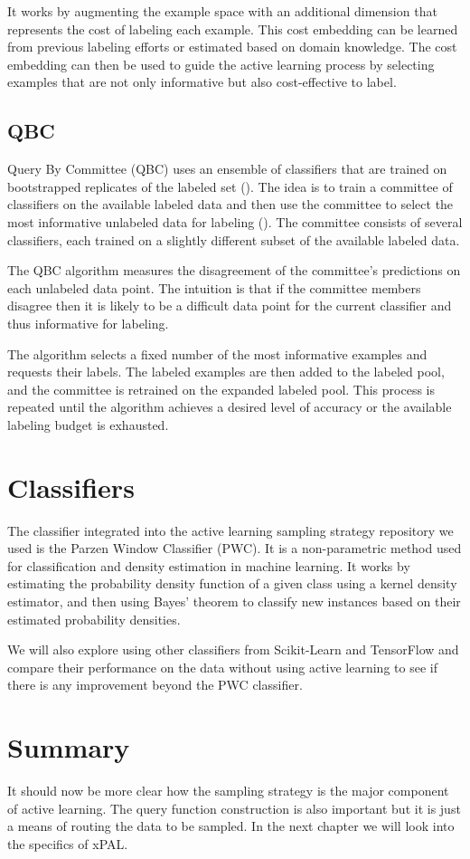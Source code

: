 It works by augmenting the example space with an additional dimension that represents the cost of labeling each example. This cost embedding can be learned from previous labeling efforts or estimated based on domain knowledge. The cost embedding can then be used to guide the active learning process by selecting examples that are not only informative but also cost-effective to label.

\subsection{QBC}
Query By Committee (QBC) uses an ensemble of classifiers that are trained on bootstrapped replicates of the labeled set (\cite{seung1992qbc}). The idea is to train a committee of classifiers on the available labeled data and then use the committee to select the most informative unlabeled data for labeling (\cite{freund1997qbc}). The committee consists of several classifiers, each trained on a slightly different subset of the available labeled data.

The QBC algorithm measures the disagreement of the committee's predictions on each unlabeled data point. The intuition is that if the committee members disagree then it is likely to be a difficult data point for the current classifier and thus informative for labeling.

The algorithm selects a fixed number of the most informative examples and requests their labels. The labeled examples are then added to the labeled pool, and the committee is retrained on the expanded labeled pool. This process is repeated until the algorithm achieves a desired level of accuracy or the available labeling budget is exhausted.

\section{Classifiers}

The classifier integrated into the active learning sampling strategy repository we used is the Parzen Window Classifier (PWC). It is a non-parametric method used for classification and density estimation in machine learning. It works by estimating the probability density function of a given class using a kernel density estimator, and then using Bayes' theorem to classify new instances based on their estimated probability densities.

We will also explore using other classifiers from Scikit-Learn and TensorFlow and compare their performance on the data without using active learning to see if there is any improvement beyond the PWC classifier.

\section{Summary}

It should now be more clear how the sampling strategy is the major component of active learning. The query function construction is also important but it is just a means of routing the data to be sampled. In the next chapter we will look into the specifics of xPAL.

